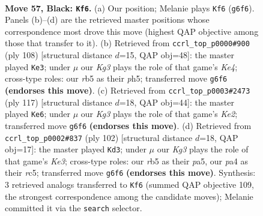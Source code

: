 \documentclass[11pt]{article}
\begin{document}
\clearpage

\begin{figure}[p]\centering
\begin{subfigure}{0.46\textwidth}\centering
\resizebox{\linewidth}{!}{%
\newchessgame
\chessboard[
  setfen={8/5p2/4p1k1/1R6/P1R1P3/4KP1r/8/8 b - - 6 57},
  showmover=false,
  pgfstyle=straightmove, color=movearrow, markmove={g6-f6}
]}
\caption{}
\end{subfigure}\hfill
\begin{subfigure}{0.46\textwidth}\centering
\resizebox{\linewidth}{!}{%
\newchessgame
\chessboard[
  setfen={8/3R1pk1/r5p1/4P2p/4K2P/5P2/8/8 w - - 30 55},
  showmover=false,
  pgfstyle=straightmove, color=movearrow, markmove={e4-e3}
]}
\caption{}
\end{subfigure}
\\[4pt]
\begin{subfigure}{0.46\textwidth}\centering
\resizebox{\linewidth}{!}{%
\newchessgame
\chessboard[
  setfen={8/4k3/5p2/6p1/7p/1R5P/1P1r2PK/8 b - - 21 59},
  showmover=false,
  pgfstyle=straightmove, color=movearrow, markmove={e7-e6}
]}
\caption{}
\end{subfigure}\hfill
\begin{subfigure}{0.46\textwidth}\centering
\resizebox{\linewidth}{!}{%
\newchessgame
\chessboard[
  setfen={8/kp5R/2p5/p1r5/P7/1P2K3/8/8 w - - 0 52},
  showmover=false,
  pgfstyle=straightmove, color=movearrow, markmove={e3-d3}
]}
\caption{}
\end{subfigure}
\caption{\textbf{Move 57, Black: \texttt{Kf6}.} (a) Our position; Melanie plays \texttt{Kf6} (\texttt{g6f6}). Panels (b)--(d) are the retrieved master positions whose correspondence most drove this move (highest QAP objective among those that transfer to it). (b) Retrieved from \texttt{ccrl\_top\_p0000\#900} (ply 108) [structural distance $d$=15, QAP obj=48]: the master played \texttt{Ke3}; under $\mu$ our \emph{Kg3} plays the role of that game's \emph{Ke4}; cross-type roles: our \emph{r}b5 as their \emph{p}h5; transferred move \texttt{g6f6} \textbf{(endorses this move)}. (c) Retrieved from \texttt{ccrl\_top\_p0003\#2473} (ply 117) [structural distance $d$=18, QAP obj=44]: the master played \texttt{Ke6}; under $\mu$ our \emph{Kg3} plays the role of that game's \emph{Ke2}; transferred move \texttt{g6f6} \textbf{(endorses this move)}. (d) Retrieved from \texttt{ccrl\_top\_p0002\#837} (ply 102) [structural distance $d$=18, QAP obj=17]: the master played \texttt{Kd3}; under $\mu$ our \emph{Kg3} plays the role of that game's \emph{Ke3}; cross-type roles: our \emph{r}b5 as their \emph{p}a5, our \emph{p}a4 as their \emph{r}c5; transferred move \texttt{g6f6} \textbf{(endorses this move)}. Synthesis: 3 retrieved analogs transferred to \texttt{Kf6} (summed QAP objective 109, the strongest correspondence among the candidate moves); Melanie committed it via the \texttt{search} selector.}
\label{fig:thought-m113}
\end{figure}
\end{document}

